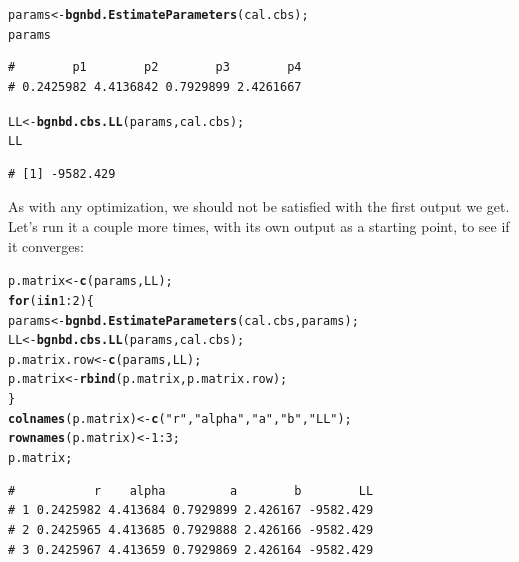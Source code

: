 \documentclass[10pt, letterpaper, onecolumn, oneside, final]{article}\usepackage[]{graphicx}\usepackage[]{color}
\makeatletter
\newcommand{\hlnum}[1]{\textcolor[rgb]{0.686,0.059,0.569}{#1}}%
\newcommand{\hlstr}[1]{\textcolor[rgb]{0.192,0.494,0.8}{#1}}%
\newcommand{\hlopt}[1]{\textcolor[rgb]{0,0,0}{#1}}%
\newcommand{\hlstd}[1]{\textcolor[rgb]{0.345,0.345,0.345}{#1}}%
\newcommand{\hlkwa}[1]{\textcolor[rgb]{0.161,0.373,0.58}{\textbf{#1}}}%
\newcommand{\hlkwb}[1]{\textcolor[rgb]{0.69,0.353,0.396}{#1}}%
\newcommand{\hlkwd}[1]{\textcolor[rgb]{0.737,0.353,0.396}{\textbf{#1}}}%
\newenvironment{kframe}{%
 \def\at@end@of@kframe{}%
 \ifinner\ifhmode%
  \def\at@end@of@kframe{\end{minipage}}%
  \begin{minipage}{\columnwidth}%
 \fi\fi%
 \def\FrameCommand##1{\hskip\@totalleftmargin \hskip-\fboxsep
 \colorbox{shadecolor}{##1}\hskip-\fboxsep
     \hskip-\linewidth \hskip-\@totalleftmargin \hskip\columnwidth}%
 \MakeFramed {\advance\hsize-\width
   \@totalleftmargin\z@ \linewidth\hsize
   \@setminipage}}%
 {\par\unskip\endMakeFramed%
 \at@end@of@kframe}
\newenvironment{knitrout}{}{} %
\makeatother
\begin{document}
\begin{knitrout}
\color{fgcolor}\begin{kframe}
\begin{alltt}
\hlstd{params} \hlkwb{<-} \hlkwd{bgnbd.EstimateParameters}\hlstd{(cal.cbs);}
\hlstd{params}
\end{alltt}
\begin{verbatim}
#        p1        p2        p3        p4 
# 0.2425982 4.4136842 0.7929899 2.4261667
\end{verbatim}
\begin{alltt}
\hlstd{LL} \hlkwb{<-} \hlkwd{bgnbd.cbs.LL}\hlstd{(params, cal.cbs);}
\hlstd{LL}
\end{alltt}
\begin{verbatim}
# [1] -9582.429
\end{verbatim}
\end{kframe}
\end{knitrout}

As with any optimization, we should not be satisfied with the first
output we get. Let's run it a couple more times, with its own output
as a starting point, to see if it converges:

\begin{knitrout}
\color{fgcolor}\begin{kframe}
\begin{alltt}
\hlstd{p.matrix} \hlkwb{<-} \hlkwd{c}\hlstd{(params, LL);}
\hlkwa{for} \hlstd{(i} \hlkwa{in} \hlnum{1}\hlopt{:}\hlnum{2}\hlstd{)\{}
\hlstd{params} \hlkwb{<-} \hlkwd{bgnbd.EstimateParameters}\hlstd{(cal.cbs, params);}
\hlstd{LL} \hlkwb{<-} \hlkwd{bgnbd.cbs.LL}\hlstd{(params, cal.cbs);}
\hlstd{p.matrix.row} \hlkwb{<-} \hlkwd{c}\hlstd{(params, LL);}
\hlstd{p.matrix} \hlkwb{<-} \hlkwd{rbind}\hlstd{(p.matrix, p.matrix.row);}
\hlstd{\}}
\hlkwd{colnames}\hlstd{(p.matrix)} \hlkwb{<-} \hlkwd{c}\hlstd{(}\hlstr{"r"}\hlstd{,} \hlstr{"alpha"}\hlstd{,} \hlstr{"a"}\hlstd{,} \hlstr{"b"}\hlstd{,} \hlstr{"LL"}\hlstd{);}
\hlkwd{rownames}\hlstd{(p.matrix)} \hlkwb{<-} \hlnum{1}\hlopt{:}\hlnum{3}\hlstd{;}
\hlstd{p.matrix;}
\end{alltt}
\begin{verbatim}
#           r    alpha         a        b        LL
# 1 0.2425982 4.413684 0.7929899 2.426167 -9582.429
# 2 0.2425965 4.413685 0.7929888 2.426166 -9582.429
# 3 0.2425967 4.413659 0.7929869 2.426164 -9582.429
\end{verbatim}
\end{kframe}
\end{knitrout}
\end{document}
